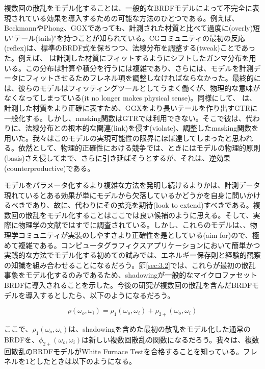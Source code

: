 \documentclass[a4j,xelatex,ja=standard]{bxjsarticle}
\begin{document}
複数回の散乱をモデル化することは、一般的なBRDFモデルによって不完全に表現されている効果を導入するための可能な方法のひとつである。例えば、BeckmannやPhong、GGXであっても、計測された材質と比べて過度に(overly)短い"テール(tails)"を持つことが知られている\cite{Burley2012}。CGコミュニティの最初の反応(reflex)は、標準のBRDF式を保ちつつ、法線分布を調整する(tweak)ことであった。例えば、\citeauthor{Bagher2012} \cite{Bagher2012}は計測した材質にフィットするようにシフトしたガンマ分布を用いる。この分布は計算や積分を行うには複雑であり、さらには、モデルを計測データにフィットさせるためフレネル項を調整しなければならなかった。最終的には、彼らのモデルはフィッティングツールとしてうまく働くが、物理的な意味がなくなってしまっている(it no longer makes physical sense)。同様にして、\citeauthor{Burley2012} \cite{Burley2012}は、計測した材質をより正確に表すため、GGXをより長いテールを作り出すGTRに一般化する。しかし、masking関数はGTRでは利用できない。そこで彼は、代わりに、法線分布との根本的な関連(link)を侵す(violate)、調整したmasking関数を用いた。我々はこのモデルの実現可能性の限界にほぼ達してしまったと思われる。依然として、物理的正確性における競争では、ときにはモデルの物理的原則(basis)さえ侵してまで、さらに引き延ばそうとするが、それは、逆効果(counterproductive)である。

モデルをパラメータ化するより複雑な方法を発明し続けるよりかは、計測データ現れているとある効果が単にモデルから欠落しているかどうかを自身に問いかけるべきであり、故に、代わりにその拡充を期待(look to extend)すべきである。複数回の散乱をモデル化することはここでは良い候補のように思える。そして、実際に物理学の文献ではすでに調査されている\cite{Bourlier2004}。しかし、これらのモデルは、、物理学コミュニティが実装のしやすさより正確性を是としている(aim for)ので、極めて複雑である。コンピュータグラフィクスアプリケーションにおいて簡単かつ実践的な方法でモデル化する初めての試みでは、エネルギー保存則と経験的観察の知識を組み合わせることになるだろう。節\ref{sec:3.2}では、これらが最初の散乱事象をモデル化するのみであるため、shadowingが一般的なマイクロファセットBRDFに導入されることを示した。今後の研究が複数回の散乱を含んだBRDFモデルを導入するとしたら、以下のようになるだろう。

\begin{equation}
    \rho(\omega_o, \omega_i) = \rho_1(\omega_o, \omega_i) + \rho_{2+}(\omega_o, \omega_i)
    \label{eq:102}
\end{equation}

ここで、$\rho_1(\omega_o, \omega_i)$は、shadowingを含めた最初の散乱をモデル化した通常のBRDFを、$\phi_{2+}(\omega_o, \omega_i)$は新しい複数回散乱の関数になるだろう。我々は、複数回散乱のBRDFモデルがWhite Furnace Testを合格することを知っている。フレネルを$1$としたときは以下のようになる。
\end{document}
